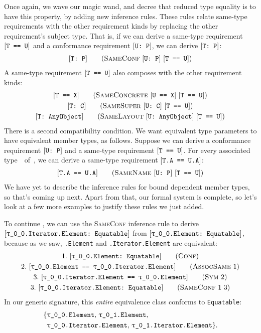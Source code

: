 \documentclass[../generics]{subfiles}
\begin{document}
Once again, we wave our magic wand, and decree that reduced type equality is to have this property, by adding new inference rules. These rules relate same-type requirements with the other requirement kinds by replacing the other requirement's subject type. That is, if we can derive a same-type requirement $[\texttt{T == U}]$ and a conformance requirement $[\texttt{U:~P}]$, we can derive $[\texttt{T:~P}]$:
\begin{gather*}
\SameConfStepDef
\end{gather*}
A same-type requirement $[\texttt{T == U}]$ also composes with the other requirement kinds:
\begin{gather*}
\SameConcreteStepDef\\
\SameSuperStepDef\\
\SameLayoutStepDef
\end{gather*}
There is a second compatibility condition. We want equivalent type parameters to have equivalent member types, as follows. Suppose we can derive a conformance requirement $[\texttt{U:~P}]$ and a same-type requirement $[\texttt{T == U}]$. For every associated type~\nA\ of~\tP, we can derive a same-type requirement $[\texttt{T.A == U.A}]$:
\begin{gather*}
\SameNameStepDef
\end{gather*}
We have yet to describe the inference rules for bound dependent member types, so that's coming up next. Apart from that, our formal system is complete, so let's look at a few more examples to justify these rules we just added.

\begin{example}
To continue , we can use the \textsc{SameConf} inference rule to derive $\ConfReq{\rT.Iterator.Element}{Equatable}$ from $\ConfReq{\rT.Element}{Equatable}$, because as we saw, \texttt{\rT.Element} and \texttt{\rT.Iterator.Element} are equivalent:
\begin{gather*}
\ConfStep{\rT.Element}{Equatable}{1}\\
\AssocSameStep{1}{\rT.Element}{\rT.Iterator.Element}{2}\\
\SymStep{2}{\rT.Iterator.Element}{\rT.Element}{3}\\
\SameConfStep{1}{3}{$\rT$.Iterator.Element}{Equatable}{3}
\end{gather*}
In our generic signature, this \emph{entire} equivalence class conforms to \texttt{Equatable}:
\begin{align*}
\{&\texttt{\rT.Element},\,\texttt{\rU.Element},\,\\
&\texttt{\rT.Iterator.Element},\,\texttt{\rU.Iterator.Element}\}.
\end{align*}
\end{example}
\end{document}
